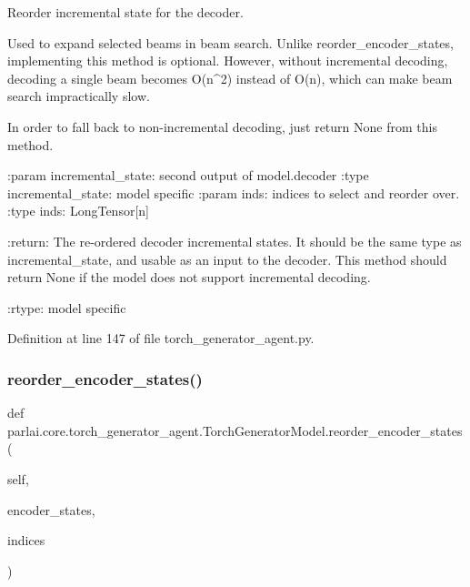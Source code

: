 \begin{DoxyVerb}Reorder incremental state for the decoder.

Used to expand selected beams in beam search. Unlike reorder_encoder_states,
implementing this method is optional. However, without incremental decoding,
decoding a single beam becomes O(n^2) instead of O(n), which can make
beam search impractically slow.

In order to fall back to non-incremental decoding, just return None from this
method.

:param incremental_state:
    second output of model.decoder
:type incremental_state:
    model specific
:param inds:
    indices to select and reorder over.
:type inds:
    LongTensor[n]

:return:
    The re-ordered decoder incremental states. It should be the same
    type as incremental_state, and usable as an input to the decoder.
    This method should return None if the model does not support
    incremental decoding.

:rtype:
    model specific
\end{DoxyVerb}
 

Definition at line 147 of file torch\+\_\+generator\+\_\+agent.\+py.

\mbox{\label{classparlai_1_1core_1_1torch__generator__agent_1_1TorchGeneratorModel_a9ed5aecabe977856b4c385ba74fa6107}} 
\subsubsection{\texorpdfstring{reorder\+\_\+encoder\+\_\+states()}{reorder\_encoder\_states()}}
{\footnotesize\ttfamily def parlai.\+core.\+torch\+\_\+generator\+\_\+agent.\+Torch\+Generator\+Model.\+reorder\+\_\+encoder\+\_\+states (\begin{DoxyParamCaption}\item[{}]{self,  }\item[{}]{encoder\+\_\+states,  }\item[{}]{indices }\end{DoxyParamCaption})}

